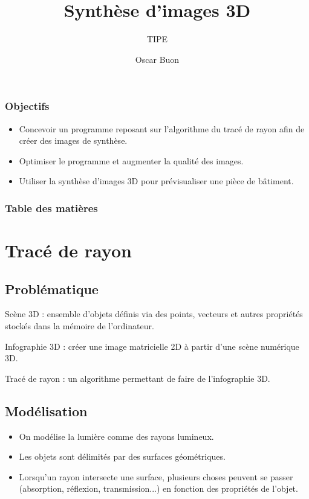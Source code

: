 \documentclass[handout]{beamer}
\title{Synthèse d’images 3D}
\subtitle{TIPE}
\author{Oscar Buon}
\begin{document}
\begin{frame}
    \maketitle
\end{frame}

\begin{frame}

    \frametitle{Objectifs}

    \begin{itemize}
        \item Concevoir un programme reposant sur l'algorithme du tracé de rayon afin de créer des images de synthèse.
        \item Optimiser le programme et augmenter la qualité des images.
        \item Utiliser la synthèse d'images 3D pour prévisualiser une pièce de bâtiment.
    \end{itemize}

\end{frame}

\begin{frame}
    \frametitle{Table des matières}
    \tableofcontents
\end{frame}

\section{Tracé de rayon}

\subsection{Problématique}

\begin{frame}
    Scène 3D : ensemble d'objets définis via des points, vecteurs et autres propriétés stockés dans la mémoire de l'ordinateur.

    Infographie 3D : créer une image matricielle 2D à partir d'une scène numérique 3D.

    Tracé de rayon : un algorithme permettant de faire de l'infographie 3D.
\end{frame}

\subsection{Modélisation}

\begin{frame}
    \begin{itemize}
        \item On modélise la lumière comme des rayons lumineux.
        \item Les objets sont délimités par des surfaces géométriques.
        \item Lorsqu'un rayon intersecte une surface, plusieurs choses peuvent se passer (absorption, réflexion, transmission...) en fonction des propriétés de l'objet.
    \end{itemize}
\end{frame}
\end{document}
